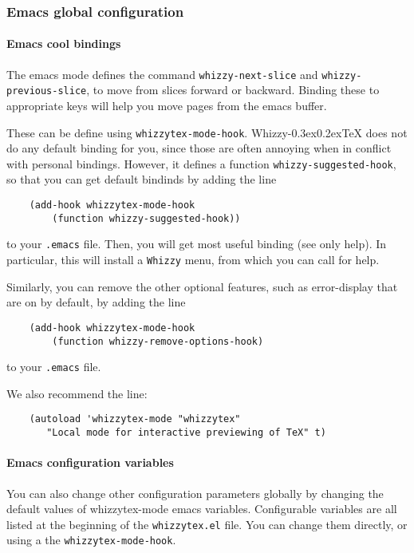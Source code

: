 \documentclass{article}
\let \lst \verb
\def \whizzy{{Whizzy\kern -0.3ex\raise 0.2ex\hbox{\TeX}}}
\begin{document}
\subsubsection {Emacs global configuration}

\paragraph {Emacs cool bindings}

The emacs mode defines the command \lst"whizzy-next-slice" and
\lst"whizzy-previous-slice", to move from slices forward or backward.
Binding these to appropriate keys will help you move pages from the emacs
buffer. 

These can be define using \lst"whizzytex-mode-hook". 
{\whizzy} does not do any default binding for you, since those are often
annoying when in conflict with personal bindings. 
However, it defines a function \lst"whizzy-suggested-hook", so that you can
get default bindinds by adding the line
\begin{verbatim}
    (add-hook whizzytex-mode-hook 
        (function whizzy-suggested-hook))
\end{verbatim}
to your \lst".emacs" file. 
Then, you will get most useful binding (see only help). 
In particular, this will install a \lst"Whizzy" menu, from which you can
call for help.

Similarly, you can remove the other optional features, 
such as error-display that are on by default, by adding the line
\begin{verbatim}
    (add-hook whizzytex-mode-hook 
        (function whizzy-remove-options-hook)
\end{verbatim}
to your \lst".emacs" file.

We also recommend the line:
\begin{verbatim}
    (autoload 'whizzytex-mode "whizzytex" 
       "Local mode for interactive previewing of TeX" t)
\end{verbatim}

\paragraph {Emacs configuration variables}

You can also change other configuration parameters globally by changing the
default values of whizzytex-mode emacs variables. 
Configurable variables are all listed at the beginning of the
\lst"whizzytex.el" file. You can change them directly, or using a 
the \lst"whizzytex-mode-hook". 
\end{document}
